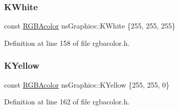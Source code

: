 \subsubsection{\texorpdfstring{K\+White}{KWhite}}
{\footnotesize\ttfamily const \hyperlink{classns_graphics_1_1_r_g_b_acolor}{R\+G\+B\+Acolor} ns\+Graphics\+::\+K\+White \{255, 255, 255\}}



Definition at line 158 of file rgbacolor.\+h.

\mbox{\label{namespacens_graphics_a445ddb81e2a910db8e01a70403988966}} 
\subsubsection{\texorpdfstring{K\+Yellow}{KYellow}}
{\footnotesize\ttfamily const \hyperlink{classns_graphics_1_1_r_g_b_acolor}{R\+G\+B\+Acolor} ns\+Graphics\+::\+K\+Yellow \{255, 255, 0\}}



Definition at line 162 of file rgbacolor.\+h.

